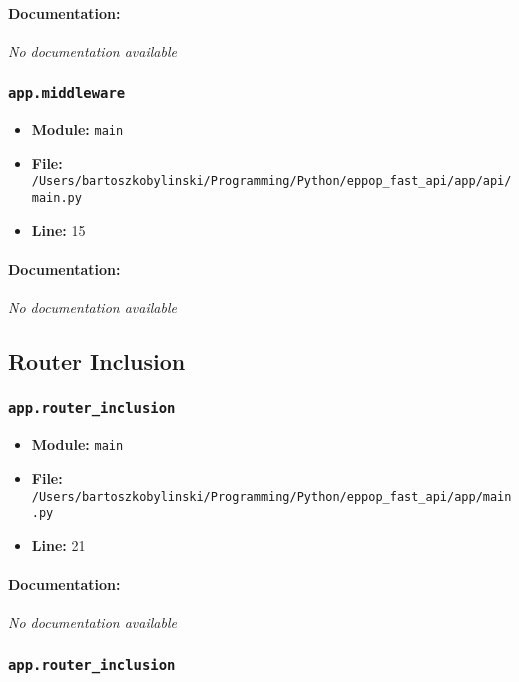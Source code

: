 \documentclass[11pt,a4paper]{article}
\begin{document}
\paragraph{Documentation:} \textit{No documentation available}


\vspace{1em}
\subsubsection{\texttt{app.middleware}}

\begin{itemize}
    \item \textbf{Module:} \texttt{main}
    \item \textbf{File:} \texttt{/Users/bartoszkobylinski/Programming/Python/eppop\_fast\_api/app/api/main.py}
    \item \textbf{Line:} 15
\end{itemize}

\paragraph{Documentation:} \textit{No documentation available}


\vspace{1em}
\subsection{Router Inclusion}

\subsubsection{\texttt{app.router\_inclusion}}

\begin{itemize}
    \item \textbf{Module:} \texttt{main}
    \item \textbf{File:} \texttt{/Users/bartoszkobylinski/Programming/Python/eppop\_fast\_api/app/main.py}
    \item \textbf{Line:} 21
\end{itemize}

\paragraph{Documentation:} \textit{No documentation available}


\vspace{1em}
\subsubsection{\texttt{app.router\_inclusion}}
\end{document}
